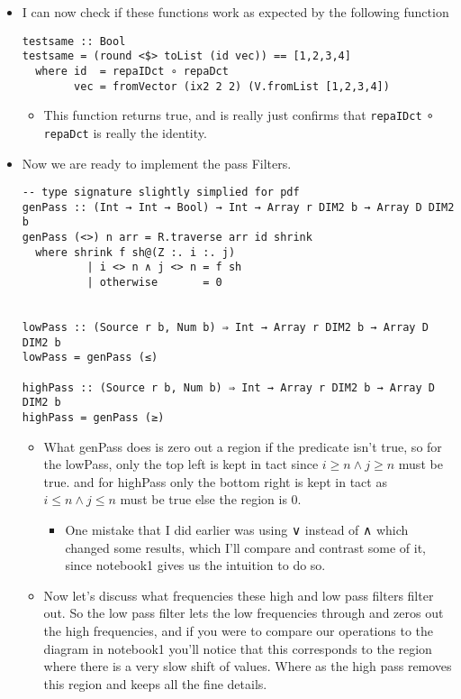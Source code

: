 \documentclass{article}
\begin{document}
\begin{enumerate}
\begin{itemize}
\item Ι can now check if these functions work as expected by the following
function
\begin{verbatim}
testsame :: Bool
testsame = (round <$> toList (id vec)) == [1,2,3,4]
  where id  = repaIDct ∘ repaDct
        vec = fromVector (ix2 2 2) (V.fromList [1,2,3,4])
\end{verbatim}
\begin{itemize}
\item This function returns true, and is really just confirms that
\texttt{repaIDct} ∘ \texttt{repaDct} is really the identity.
\end{itemize}

\item Now we are ready to implement the pass Filters.
\begin{verbatim}
-- type signature slightly simplied for pdf
genPass :: (Int → Int → Bool) → Int → Array r DIM2 b → Array D DIM2 b
genPass (<>) n arr = R.traverse arr id shrink
  where shrink f sh@(Z :. i :. j)
          | i <> n ∧ j <> n = f sh
          | otherwise       = 0


lowPass :: (Source r b, Num b) ⇒ Int → Array r DIM2 b → Array D DIM2 b
lowPass = genPass (≤)

highPass :: (Source r b, Num b) ⇒ Int → Array r DIM2 b → Array D DIM2 b
highPass = genPass (≥)
\end{verbatim}
\begin{itemize}
\item What genPass does is zero out a region if the predicate isn't
true, so for the lowPass, only the top left is kept in tact since
$i ≥ n ∧ j ≥ n$ must be true. and for highPass only the bottom
right is kept in tact as $i ≤ n ∧ j ≤ n$ must be true else the
region is 0.

\begin{itemize}
\item One mistake that Ι did earlier was using ∨ instead of ∧ which
changed some results, which I'll compare and contrast some of it,
since notebook1 gives us the intuition to do so.
\end{itemize}

\item Now let's discuss what frequencies these high and low pass filters
filter out. So the low pass filter lets the low frequencies
through and zeros out the high frequencies, and if you were to compare
our operations to the diagram in notebook1 you'll notice that this
corresponds to the region where there is a very slow shift of
values. Where as the high pass removes this region and keeps all the
fine details.
\end{itemize}


\end{itemize}
\end{enumerate}
\end{document}
